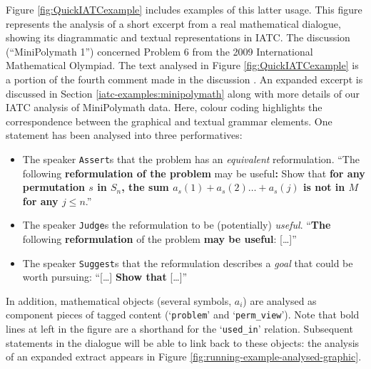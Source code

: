 \documentclass[smallextended,oneside]{svjour3}       %
\let\cite\citep
\begin{document}
Figure \ref{fig:QuickIATCexample} includes examples
of this latter usage.  This figure represents the analysis of a short
excerpt from  a real mathematical dialogue, showing its diagrammatic and textual representations in IATC.
The discussion (``MiniPolymath 1'') concerned Problem 6 from the 2009 International Mathematical Olympiad.  The text analysed in Figure \ref{fig:QuickIATCexample} is a portion of the fourth comment made in the discussion \cite[\href{https://wp.me/p3qzP-Ef\#comment-40141}{20 July, 6:50 am}]{tao2009imo}.
An expanded excerpt is discussed in Section \ref{iatc-examples:minipolymath}
along with more details of our IATC analysis of MiniPolymath data.
Here, colour coding highlights the correspondence between the
graphical and textual grammar elements.
One statement has been analysed into three performatives: 
\begin{itemize}\label{list:example-analysis}
\item The speaker \texttt{Assert}s that the problem has an \emph{equivalent} reformulation. ``The following \textbf{reformulation of the problem} may be useful\textbf{:} Show that \textbf{for any permutation $s$ in $S_n$, the sum $a_s(1)+a_s(2)\ldots +a_s(j)$ is not in $M$ for any $j\leq n$}.''
\item The speaker \texttt{Judge}s the reformulation to be (potentially) \emph{useful}. ``\textbf{The} following \textbf{reformulation} of the problem \textbf{may be useful}: [\ldots]''
\item The speaker \texttt{Suggest}s that the reformulation describes a \emph{goal} that could be worth pursuing:
``[\ldots] \textbf{Show that} [\ldots]''
\end{itemize}
In addition, mathematical objects (several symbols, $a_i$) are analysed
as component pieces of tagged content
(`\texttt{problem}' and `\texttt{perm\_view}').  Note that bold lines
at left in the figure are a shorthand for the `\texttt{used\_in}'
relation.  Subsequent statements in the dialogue will be able to link back to
these objects: the analysis of an expanded extract appears in Figure \ref{fig:running-example-analysed-graphic}.
\end{document}
